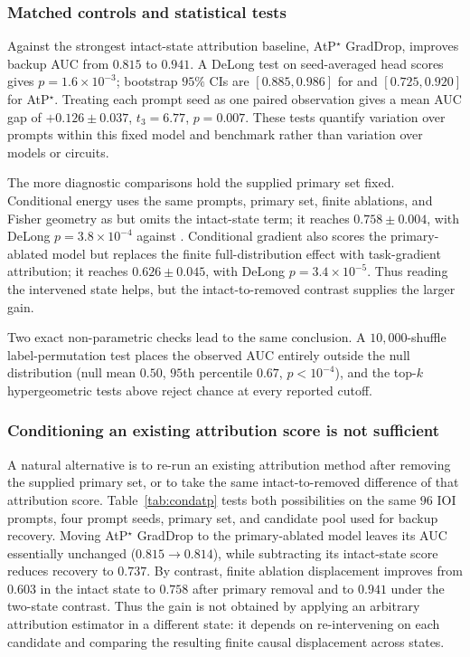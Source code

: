 \subsubsection{Matched controls and statistical tests}
\label{app:sig}

Against the strongest intact-state attribution baseline, AtP$^\star$ GradDrop, \coax improves backup AUC from $0.815$ to $0.941$.
A DeLong test on seed-averaged head scores gives $p=1.6{\times}10^{-3}$; bootstrap $95\%$ CIs are $[0.885,0.986]$ for \coax and $[0.725,0.920]$ for AtP$^\star$.
Treating each prompt seed as one paired observation gives a mean AUC gap of $+0.126{\pm}0.037$, $t_3=6.77$, $p=0.007$.
These tests quantify variation over prompts within this fixed model and benchmark rather than variation over models or circuits.

The more diagnostic comparisons hold the supplied primary set fixed.
Conditional energy uses the same prompts, primary set, finite ablations, and Fisher geometry as \coax but omits the intact-state term; it reaches $0.758{\pm}0.004$, with DeLong $p=3.8{\times}10^{-4}$ against \coax.
Conditional gradient also scores the primary-ablated model but replaces the finite full-distribution effect with task-gradient attribution; it reaches $0.626{\pm}0.045$, with DeLong $p=3.4{\times}10^{-5}$.
Thus reading the intervened state helps, but the intact-to-removed contrast supplies the larger gain.

Two exact non-parametric checks lead to the same conclusion.
A $10{,}000$-shuffle label-permutation test places the observed AUC entirely outside the null distribution (null mean $0.50$, $95$th percentile $0.67$, $p<10^{-4}$), and the top-$k$ hypergeometric tests above reject chance at every reported cutoff.


\subsubsection{Conditioning an existing attribution score is not sufficient}
\label{app:condatp}

A natural alternative is to re-run an existing attribution method after removing the supplied primary set, or to take the same intact-to-removed difference of that attribution score.
Table~\ref{tab:condatp} tests both possibilities on the same $96$ IOI prompts, four prompt seeds, primary set, and candidate pool used for backup recovery.
Moving AtP$^\star$ GradDrop to the primary-ablated model leaves its AUC essentially unchanged ($0.815\rightarrow0.814$), while subtracting its intact-state score reduces recovery to $0.737$.
By contrast, finite ablation displacement improves from $0.603$ in the intact state to $0.758$ after primary removal and to $0.941$ under the two-state contrast.
Thus the gain is not obtained by applying an arbitrary attribution estimator in a different state: it depends on re-intervening on each candidate and comparing the resulting finite causal displacement across states.

